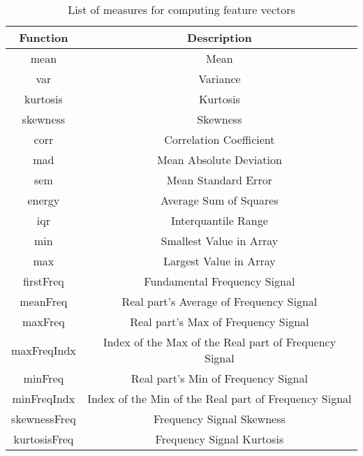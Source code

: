 \begin{table}[H]
    \centering
    \begin{tabular}{||c||c||}
        \hline
        \textbf{Function} & \textbf{Description} \\
        \hline
        mean & Mean \\
        var & Variance \\
        kurtosis & Kurtosis \\
        skewness & Skewness \\
        corr & Correlation Coefficient \\
        mad & Mean Absolute Deviation \\
        sem & Mean Standard Error \\
        energy & Average Sum of Squares \\
        iqr & Interquantile Range \\
        min & Smallest Value in Array \\
        max & Largest Value in Array \\
        firstFreq & Fundamental Frequency Signal \\
        meanFreq & Real part's Average of Frequency Signal \\
        maxFreq & Real part's Max of Frequency Signal \\
        maxFreqIndx & Index of the Max of the Real part of Frequency Signal \\ 
        minFreq & Real part's Min of Frequency Signal \\
        minFreqIndx & Index of the Min of the Real part of Frequency Signal \\ 
        skewnessFreq & Frequency Signal Skewness \\
        kurtosisFreq & Frequency Signal Kurtosis \\
        \hline
    \end{tabular}
    \caption{List of measures for computing feature vectors}
\label{tab:ml_features}
\end{table}

